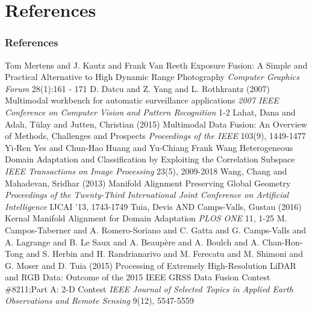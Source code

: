 \documentclass{beamer}
\begin{document}
\section{References}
\begin{frame}[allowframebreaks]
  \frametitle{References}
  \footnotesize{
    \begin{thebibliography}{99} %
     Tom Mertens and J. Kautz and Frank Van Reeth
      \newblock Exposure Fusion: A Simple and Practical Alternative to High Dynamic Range Photography
      \newblock \emph{Computer Graphics Forum} 28(1):161 - 171
     D. Datcu and Z. Yang and L. Rothkrantz (2007)
      \newblock Multimodal workbench for automatic surveillance applications
      \newblock \emph{2007 IEEE Conference on Computer Vision and Pattern Recognition} 1-2
     Lahat, Dana and Adal{\i}, T{\"u}lay and Jutten, Christian (2015)
      \newblock Multimodal Data Fusion: An Overview of Methods, Challenges and Prospects
      \newblock \emph{Proceedings of the IEEE } 103(9), 1449-1477
     Yi-Ren Yes and Chun-Hao Huang and Yu-Chiang Frank Wang
      \newblock Heterogeneous Domain Adaptation and Classification by Exploiting the Correlation Subspace
      \newblock \emph{IEEE Transactions on Image Processing} 23(5), 2009-2018
     Wang, Chang and Mahadevan, Sridhar (2013)
      \newblock Manifold Alignment Preserving Global Geometry
      \newblock \emph{Proceedings of the Twenty-Third International Joint Conference on Artificial Intelligence} IJCAI '13, 1743-1749
     Tuia, Devis AND Camps-Valls, Gustau (2016)
      \newblock Kernal Manifold Alignment for Domain Adaptation
      \newblock \emph{PLOS ONE} 11, 1-25
     M. Campos-Taberner and A. Romero-Soriano and C. Gatta and G. Camps-Valls and A. Lagrange and B. Le Saux and A. Beaupère and A. Boulch and A. Chan-Hon-Tong and S. Herbin and H. Randrianarivo and M. Ferecatu and M. Shimoni and G. Moser and D. Tuia (2015)
      \newblock Processing of Extremely High-Resolution LiDAR and RGB Data: Outcome of the 2015 IEEE GRSS Data Fusion Contest \#8211;Part A: 2-D Contest
      \newblock \emph{IEEE Journal of Selected Topics in Applied Earth Observations and Remote Sensing} 9(12), 5547-5559

\end{thebibliography}}
\end{frame}
\end{document}
